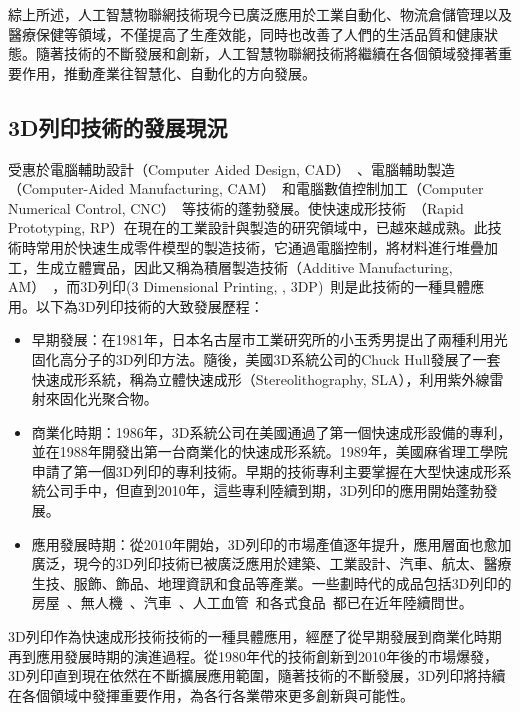 \documentclass[class=NCU_thesis, crop=false]{standalone}
\begin{document}
綜上所述，人工智慧物聯網技術現今已廣泛應用於工業自動化、物流倉儲管理以及醫療保健等領域，不僅提高了生產效能，同時也改善了人們的生活品質和健康狀態。隨著技術的不斷發展和創新，人工智慧物聯網技術將繼續在各個領域發揮著重要作用，推動產業往智慧化、自動化的方向發展。

\subsection{3D列印技術的發展現況}
受惠於電腦輔助設計（Computer Aided Design, CAD）~\cite{sarcar2008computer}、電腦輔助製造（Computer-Aided Manufacturing, CAM）~\cite{elanchezhian2007computer}和電腦數值控制加工（Computer Numerical Control, CNC）~\cite{thyer2014computer}等技術的蓬勃發展。使快速成形技術~\cite{PHAM19981257}（Rapid Prototyping, RP）在現在的工業設計與製造的研究領域中，已越來越成熟。此技術時常用於快速生成零件模型的製造技術，它通過電腦控制，將材料進行堆疊加工，生成立體實品，因此又稱為積層製造技術（Additive Manufacturing, AM）~\cite{wong2012review}，而3D列印(3 Dimensional Printing, , 3DP)~\cite{shahrubudin2019overview}則是此技術的一種具體應用。以下為3D列印技術的大致發展歷程：


\begin{itemize}
	\item 早期發展：在1981年，日本名古屋市工業研究所的小玉秀男提出了兩種利用光固化高分子的3D列印方法。隨後，美國3D系統公司的Chuck Hull發展了一套快速成形系統，稱為立體快速成形（Stereolithography, SLA），利用紫外線雷射來固化光聚合物。

	\item 商業化時期：1986年，3D系統公司在美國通過了第一個快速成形設備的專利，並在1988年開發出第一台商業化的快速成形系統。1989年，美國麻省理工學院申請了第一個3D列印的專利技術。早期的技術專利主要掌握在大型快速成形系統公司手中，但直到2010年，這些專利陸續到期，3D列印的應用開始蓬勃發展。

	\item 應用發展時期：從2010年開始，3D列印的市場產值逐年提升，應用層面也愈加廣泛，現今的3D列印技術已被廣泛應用於建築、工業設計、汽車、航太、醫療生技、服飾、飾品、地理資訊和食品等產業。一些劃時代的成品包括3D列印的房屋~\cite{hager20163d}、無人機~\cite{moon2014application}、汽車~\cite{chinthavali20163d}、人工血管~\cite{papaioannou20193d}和各式食品~\cite{liu20173d}都已在近年陸續問世。

\end{itemize}
3D列印作為快速成形技術技術的一種具體應用，經歷了從早期發展到商業化時期再到應用發展時期的演進過程。從1980年代的技術創新到2010年後的市場爆發，3D列印直到現在依然在不斷擴展應用範圍，隨著技術的不斷發展，3D列印將持續在各個領域中發揮重要作用，為各行各業帶來更多創新與可能性。
\end{document}
